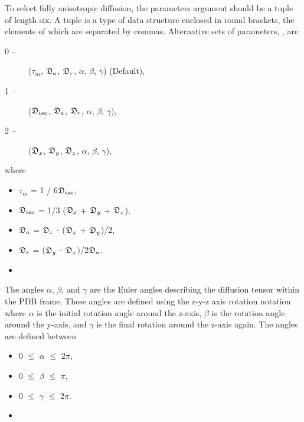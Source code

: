  To select fully anisotropic diffusion, the parameters argument should be a tuple of length six.  A tuple is a type of data structure enclosed in round brackets, the elements of which are separated by commas.  Alternative sets of parameters, , are 
  

 \begin{description} 
 \item[0 --]  ($\tau_m$, $\mathfrak{D}_a$, $\mathfrak{D}_r$, $\alpha$, $\beta$, $\gamma$)   (Default),  
 \item[1 --]  ($\mathfrak{D}_{iso}$, $\mathfrak{D}_a$, $\mathfrak{D}_r$, $\alpha$, $\beta$, $\gamma$),  
 \item[2 --]  ($\mathfrak{D}_x$, $\mathfrak{D}_y$, $\mathfrak{D}_z$, $\alpha$, $\beta$, $\gamma$),  
 \end{description} 
  

 where 
  

 \begin{itemize} 
 \item[] $\tau_m$ = 1 / 6$\mathfrak{D}_{iso}$,  
 \item[] $\mathfrak{D}_{iso}$ = 1/3 ($\mathfrak{D}_x$ + $\mathfrak{D}_y$ + $\mathfrak{D}_z$),  
 \item[] $\mathfrak{D}_a$ = $\mathfrak{D}_z$ - ($\mathfrak{D}_x$ + $\mathfrak{D}_y$)/2,  
 \item[] $\mathfrak{D}_r$ = ($\mathfrak{D}_y$ - $\mathfrak{D}_x$)/2$\mathfrak{D}_a$.  
 \item[]  
 \end{itemize} 
  

 The angles $\alpha$, $\beta$, and $\gamma$ are the Euler angles describing the diffusion tensor within the PDB frame.  These angles are defined using the z-y-z axis rotation notation where $\alpha$ is the initial rotation angle around the z-axis, $\beta$ is the rotation angle around the y-axis, and $\gamma$ is the final rotation around the z-axis again.  The angles are defined between 
  

 \begin{itemize} 
 \item[] 0 $\le$ $\alpha$ $\le$ 2$\pi$,  
 \item[] 0 $\le$ $\beta$ $\le$ $\pi$,  
 \item[] 0 $\le$ $\gamma$ $\le$ 2$\pi$.  
 \item[]  
 \end{itemize} 
  


